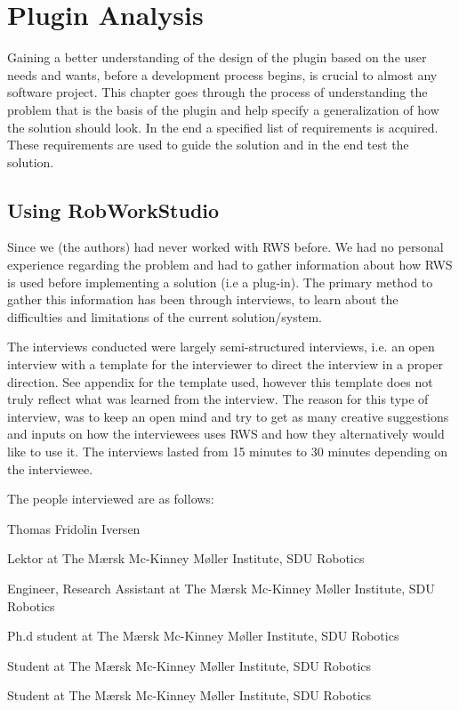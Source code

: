 \section{Plugin Analysis}
Gaining a better understanding of the design of the plugin based on the user needs and wants, before a development process begins, is crucial to almost any software project. This chapter goes through the process of understanding the problem that is the basis of the plugin and help specify a generalization of how the solution should look. In the end a specified list of requirements is acquired. These requirements are used to guide the solution and in the end test the solution.

\subsection{Using RobWorkStudio}
Since we (the authors) had never worked with RWS before. We had no personal experience regarding the problem and had to gather information about how RWS is used before implementing a solution (i.e a plug-in). The primary method to gather this information has been through interviews, to learn about the difficulties and limitations of the current solution/system.

The interviews conducted were largely semi-structured interviews, i.e. an open interview with a template for the interviewer to direct the interview in a proper direction. See appendix for the template used, however this template does not truly reflect what was learned from the interview. The reason for this type of interview, was to keep an open mind and try to get as many creative suggestions and inputs on how the interviewees uses RWS and how they alternatively would like to use it. The interviews lasted from 15 minutes to 30 minutes depending on the interviewee.

The people interviewed are as follows:

\begin{labeling}{Thomas Fridolin Iversen}
\item [Lars-Peter Ellekilde] Lektor at The Mærsk Mc-Kinney Møller Institute, SDU Robotics
\item [Thomas Nicky Thuelsen] Engineer, Research Assistant at The Mærsk Mc-Kinney Møller Institute, SDU Robotics
\item [Thomas Fridolin Iversen] Ph.d student at The Mærsk Mc-Kinney Møller Institute, SDU Robotics
\item [Michael Kjær Schmidt] Student at The Mærsk Mc-Kinney Møller Institute, SDU Robotics
\item [Kristian Møller Hansen] Student at The Mærsk Mc-Kinney Møller Institute, SDU Robotics
\end{labeling}

